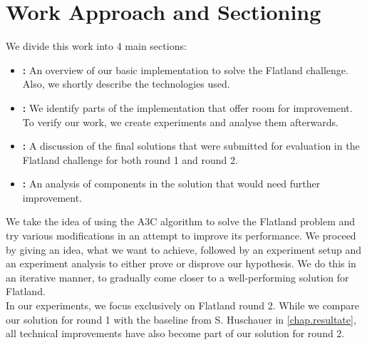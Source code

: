 \section{Work Approach and Sectioning}\label{basic_cons}
We divide this work into 4 main sections:
\begin{itemize}
	\item \textbf{:} An overview of our basic implementation to solve the Flatland challenge. Also, we shortly describe the technologies used.
	\item \textbf{:} We identify parts of the implementation that offer room for improvement. To verify our work, we create experiments and analyse them afterwards.
	\item \textbf{:} A discussion of the final solutions that were submitted for evaluation in the Flatland challenge for both round 1 and round 2.
	\item \textbf{:} An analysis of components in the solution that would need further improvement.
\end{itemize}
We take the idea of using the A3C algorithm to solve the Flatland problem and try various modifications in an attempt to improve its performance. We proceed by giving an idea, what we want to achieve, followed by an experiment setup and an experiment analysis to either prove or disprove our hypothesis. We do this in an iterative manner, to gradually come closer to a well-performing solution for Flatland.\\
In our experiments, we focus exclusively on Flatland round 2. While we compare our solution for round 1 with the baseline from S. Huschauer in \autoref{chap.resultate}, all technical improvements have also become part of our solution for round 2.
